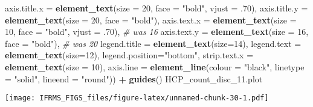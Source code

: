 \documentclass[
]{article}
\newenvironment{Shaded}{\begin{snugshade}}{\end{snugshade}}
\newcommand{\CommentTok}[1]{\textcolor[rgb]{0.56,0.35,0.01}{\textit{#1}}}
\newcommand{\DataTypeTok}[1]{\textcolor[rgb]{0.13,0.29,0.53}{#1}}
\newcommand{\DecValTok}[1]{\textcolor[rgb]{0.00,0.00,0.81}{#1}}
\newcommand{\FloatTok}[1]{\textcolor[rgb]{0.00,0.00,0.81}{#1}}
\newcommand{\KeywordTok}[1]{\textcolor[rgb]{0.13,0.29,0.53}{\textbf{#1}}}
\newcommand{\NormalTok}[1]{#1}
\newcommand{\OperatorTok}[1]{\textcolor[rgb]{0.81,0.36,0.00}{\textbf{#1}}}
\newcommand{\StringTok}[1]{\textcolor[rgb]{0.31,0.60,0.02}{#1}}
\begin{document}
\begin{Shaded}
\begin{Highlighting}[]
        \DataTypeTok{axis.title.x =} \KeywordTok{element_text}\NormalTok{(}\DataTypeTok{size =} \DecValTok{20}\NormalTok{, }\DataTypeTok{face =} \StringTok{"bold"}\NormalTok{, }\DataTypeTok{vjust =} \FloatTok{.70}\NormalTok{),}
        \DataTypeTok{axis.title.y =} \KeywordTok{element_text}\NormalTok{(}\DataTypeTok{size =} \DecValTok{20}\NormalTok{, }\DataTypeTok{face =} \StringTok{"bold"}\NormalTok{),}
        \DataTypeTok{axis.text.x =} \KeywordTok{element_text}\NormalTok{(}\DataTypeTok{size =} \DecValTok{10}\NormalTok{, }\DataTypeTok{face =} \StringTok{"bold"}\NormalTok{, }\DataTypeTok{vjust =} \FloatTok{.70}\NormalTok{), }\CommentTok{# was 16}
        \DataTypeTok{axis.text.y =} \KeywordTok{element_text}\NormalTok{(}\DataTypeTok{size =} \DecValTok{16}\NormalTok{, }\DataTypeTok{face =} \StringTok{"bold"}\NormalTok{), }\CommentTok{# was 20}
        \DataTypeTok{legend.title =} \KeywordTok{element_text}\NormalTok{(}\DataTypeTok{size=}\DecValTok{14}\NormalTok{), }
        \DataTypeTok{legend.text =} \KeywordTok{element_text}\NormalTok{(}\DataTypeTok{size=}\DecValTok{12}\NormalTok{),}
        \DataTypeTok{legend.position=}\StringTok{"bottom"}\NormalTok{, }
        \DataTypeTok{strip.text.x =} \KeywordTok{element_text}\NormalTok{(}\DataTypeTok{size =} \DecValTok{10}\NormalTok{),}
        \DataTypeTok{axis.line =} \KeywordTok{element_line}\NormalTok{(}\DataTypeTok{colour =} \StringTok{"black"}\NormalTok{, }\DataTypeTok{linetype =} \StringTok{"solid"}\NormalTok{, }\DataTypeTok{lineend =} \StringTok{"round"}\NormalTok{)) }\OperatorTok{+}\StringTok{ }
\StringTok{  }\KeywordTok{guides}\NormalTok{() }
\NormalTok{HCP_count_disc_}\FloatTok{11.}\NormalTok{plot}
\end{Highlighting}
\end{Shaded}

\texttt{[image: IFRMS\_FIGS\_files/figure-latex/unnamed-chunk-30-1.pdf]}
\end{document}
